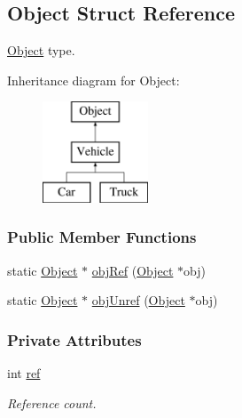 \hypertarget{struct_object}{}\subsection{Object Struct Reference}
\label{struct_object}


\hyperlink{struct_object}{Object} type.  


Inheritance diagram for Object\+:\begin{figure}[H]
\begin{center}
\leavevmode
\includegraphics[height=3.000000cm]{struct_object}
\end{center}
\end{figure}
\subsubsection*{Public Member Functions}
\begin{DoxyCompactItemize}
\item 
static \hyperlink{struct_object}{Object} $\ast$ \hyperlink{struct_object_a71225073d06a793b9a6ea9263ed37b12}{obj\+Ref} (\hyperlink{struct_object}{Object} $\ast$obj)
\item 
static \hyperlink{struct_object}{Object} $\ast$ \hyperlink{struct_object_a924ee0cecc906d148022b3f0d6325cfb}{obj\+Unref} (\hyperlink{struct_object}{Object} $\ast$obj)
\end{DoxyCompactItemize}
\subsubsection*{Private Attributes}
\begin{DoxyCompactItemize}
\item 
\mbox{\label{struct_object_a1b6037fba835e83243ababce426ff9af}} 
int \hyperlink{struct_object_a1b6037fba835e83243ababce426ff9af}{ref}
\begin{DoxyCompactList}\small\item\em Reference count. \end{DoxyCompactList}\end{DoxyCompactItemize}


